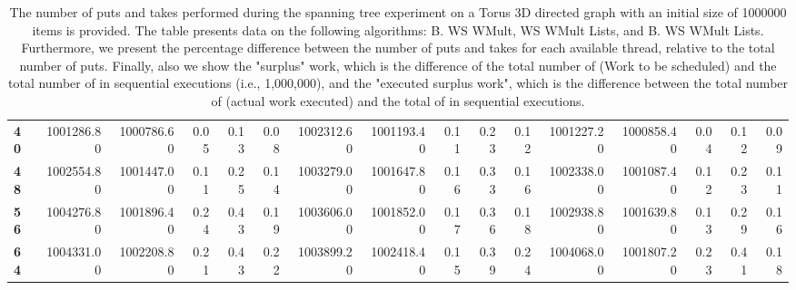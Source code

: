 \begin{table}[!ht]
{\begin{tabular}{lrrrrrrrrrrrrrrr}
\textbf{40} &  1001286.80 & 1000786.60 &           0.05 &        0.13 &                 0.08 &     1002312.60 & 1001193.40 &           0.11 &        0.23 &                 0.12 &        1001227.20 & 1000858.40 &           0.04 &        0.12 &                 0.09 \\
\textbf{48} &  1002554.80 & 1001447.00 &           0.11 &        0.25 &                 0.14 &     1003279.00 & 1001647.80 &           0.16 &        0.33 &                 0.16 &        1002338.00 & 1001087.40 &           0.12 &        0.23 &                 0.11 \\
\textbf{56} &  1004276.80 & 1001896.40 &           0.24 &        0.43 &                 0.19 &     1003606.00 & 1001852.00 &           0.17 &        0.36 &                 0.18 &        1002938.80 & 1001639.80 &           0.13 &        0.29 &                 0.16 \\
\textbf{64} &  1004331.00 & 1002208.80 &           0.21 &        0.43 &                 0.22 &     1003899.20 & 1002418.40 &           0.15 &        0.39 &                 0.24 &        1004068.00 & 1001807.20 &           0.23 &        0.41 &                 0.18 \\
\bottomrule
\end{tabular}}
\label{difference-Torus_3D_directed-1000000-B_WS_NC_MULT_OPT-WS_NC_MULT_LA_OPT-B_WS_NC_MULT_LA_OPT}
\caption{The number of puts and takes performed during the
    spanning tree experiment on a Torus 3D directed graph with an initial size
    of 1000000 items is provided. The table presents data on the
    following algorithms: B. WS WMult, WS WMult Lists, and
    B. WS WMult Lists. Furthermore, we present the percentage difference
    between the number of puts and takes for each available thread,
    relative to the total number of puts. Finally, also we show the
    "surplus" work, which is the difference of the total number of
    \Puts (Work to be scheduled) and the total number of \Puts in
    sequential executions (i.e., 1,000,000), and the "executed surplus
    work", which is the difference between the total number of \Takes
    (actual work executed) and the total of \Takes in sequential
    executions.}
\end{table}
